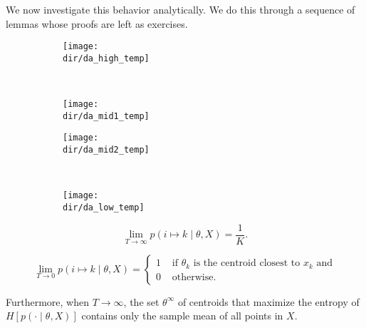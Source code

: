 We now investigate this behavior analytically. We do this through a
sequence of lemmas whose proofs are left as exercises.

\begin{figure}
    \centering
    \begin{subfigure}[b]{0.4\textwidth}
        \texttt{[image: \\dir/da\_high\_temp]}
        \caption{}
        \label{fig:da_high_temp}
    \end{subfigure}
    ~ %
    \begin{subfigure}[b]{0.4\textwidth}
        \texttt{[image: \\dir/da\_mid1\_temp]}
        \caption{}
        \label{fig:da_mid1_temp}
    \end{subfigure}
    
    \begin{subfigure}[b]{0.4\textwidth}
        \texttt{[image: \\dir/da\_mid2\_temp]}
        \caption{}
        \label{fig:da_mid2_temp}
    \end{subfigure}
    ~ %
    \begin{subfigure}[b]{0.4\textwidth}
        \texttt{[image: \\dir/da\_low\_temp]}
        \caption{}
        \label{fig:da_low_temp}
    \end{subfigure}
    \caption{}\label{fig:da_phase_trans}
\end{figure}

\begin{theorem}
\begin{equation}
\lim_{T \to \infty} p\left(i \mapsto k \mid \theta, X\right) = \frac{1}{K}.
\end{equation}

\begin{equation}
\lim_{T \to 0} p\left(i \mapsto k \mid \theta, X\right) = \begin{cases}
1 & \text{ if $\theta_k$ is the centroid closest to $x_k$ and}\\
0 & \text{ otherwise}.
\end{cases}
\end{equation}

Furthermore, when $T \to \infty$, the set $\theta^\infty$ of centroids that maximize the entropy of $H\left[p\left(\cdot \mid \theta, X\right)\right]$ contains only the sample mean of all points in $X$.
\label{lem:da_extreme_temps}
\end{theorem}

